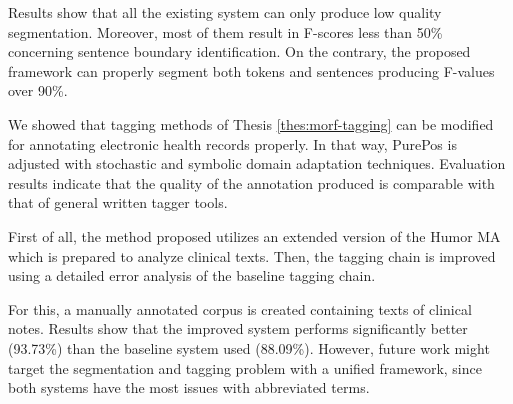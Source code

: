 Results show that all the existing system can only produce low quality segmentation.
Moreover, most of them result in F-scores less than 50\% concerning sentence boundary identification.
On the contrary, the proposed framework can properly segment both tokens and sentences producing F-values over 90\%.


\thesisline%

\begin{core}
\begin{thesis}%
\label{thes:clin-pos}
We showed that tagging methods of Thesis \ref{thes:morf-tagging} can be modified for annotating electronic health records properly.
In that way, PurePos is adjusted with stochastic and symbolic domain adaptation techniques.
Evaluation results indicate that the quality of the annotation produced is comparable with that of general written tagger tools.
\end{thesis}

\begin{pub}
\cite{Orosz2013,Orosz2014b} 
\end{pub}
\end{core}

First of all, the method proposed utilizes an extended version of the Humor MA which is prepared to analyze clinical texts.
Then, the tagging chain is improved using a detailed error analysis of the baseline tagging chain.

For this, a manually annotated corpus is created containing texts of clinical notes.
Results show that the improved system performs significantly better (93.73\%) than the baseline system used (88.09\%).
However, future work might target the segmentation and tagging problem with a unified framework, since both systems have the most issues with abbreviated terms.

\let\thesubsection=\oldthesubsection